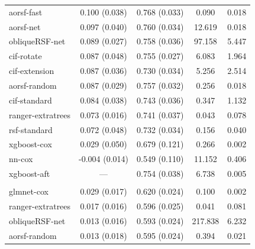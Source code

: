 \documentclass{article}\usepackage[]{graphicx}\usepackage[]{xcolor}
\newenvironment{knitrout}{}{} %
\begin{document}
\begin{knitrout}
\begin{longtable}[t]{lcccc}
\hspace{1em}aorsf-fast & 0.100 (0.038) & 0.768 (0.033) & 0.090 & 0.018\\
\hspace{1em}aorsf-net & 0.097 (0.040) & 0.760 (0.034) & 12.619 & 0.018\\
\hspace{1em}obliqueRSF-net & 0.089 (0.027) & 0.758 (0.036) & 97.158 & 5.447\\
\hspace{1em}cif-rotate & 0.087 (0.048) & 0.755 (0.027) & 6.083 & 1.964\\
\hspace{1em}cif-extension & 0.087 (0.036) & 0.730 (0.034) & 5.256 & 2.514\\
\hspace{1em}aorsf-random & 0.087 (0.029) & 0.757 (0.032) & 0.256 & 0.018\\
\hspace{1em}cif-standard & 0.084 (0.038) & 0.743 (0.036) & 0.347 & 1.132\\
\hspace{1em}ranger-extratrees & 0.073 (0.016) & 0.741 (0.037) & 0.043 & 0.078\\
\hspace{1em}rsf-standard & 0.072 (0.048) & 0.732 (0.034) & 0.156 & 0.040\\
\hspace{1em}xgboost-cox & 0.029 (0.050) & 0.679 (0.121) & 0.266 & 0.002\\
\hspace{1em}nn-cox & -0.004 (0.014) & 0.549 (0.110) & 11.152 & 0.406\\
\hspace{1em}xgboost-aft & --- & 0.754 (0.038) & 6.738 & 0.005\\
\addlinespace[0.3em]
\multicolumn{5}{l}{\textit{\textbf{FCL; relapse, n = 541, p = 7}}}\\
\hline
\hspace{1em}glmnet-cox & 0.029 (0.017) & 0.620 (0.024) & 0.100 & 0.002\\
\hspace{1em}ranger-extratrees & 0.017 (0.016) & 0.596 (0.025) & 0.041 & 0.081\\
\hspace{1em}obliqueRSF-net & 0.013 (0.016) & 0.593 (0.024) & 217.838 & 6.232\\
\hspace{1em}aorsf-random & 0.013 (0.018) & 0.595 (0.024) & 0.394 & 0.021\\

\end{longtable}
\end{knitrout}
\end{document}
